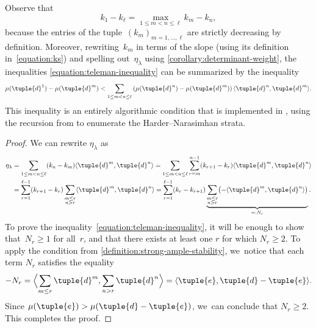 Observe that\vspace*{-5pt}
\begin{equation*}
k_1-k_\ell=\max_{1\leq m<n\leq\ell}k_m-k_n,
\end{equation*}
because the entries of the tuple~$(k_m)_{m=1,\ldots,\ell}$ are strictly decreasing by definition.
Moreover,
rewriting~$k_m$ in terms of the slope
(using its definition in~\eqref{equation:ks})
and spelling out~$\eta_\lambda$ using \cref{corollary:determinant-weight},
the inequalities \eqref{equation:teleman-inequality}
can be summarized by the inequality\vspace*{-1pt}
\begin{equation}
\label{equation:teleman-inequality-for-real}
\mu(\tuple{d}^1)-\mu(\tuple{d}^m)
<
\sum_{1\leq m<n\leq\ell}\left( \mu(\tuple{d}^n)-\mu(\tuple{d}^m) \right)\langle\tuple{d}^n,\tuple{d}^m\rangle.
\end{equation}
This inequality is an entirely algorithmic condition that is implemented in \cite{quivertools},
using the recursion from \cite[Cor.\,3.5]{MR1974891} to enumerate the Harder--Narasimhan strata.

\begin{proof}
We can rewrite $\eta_\lambda$ as\vspace*{-5pt}
\begin{align*}
\eta_\lambda
&= \sum_{1\leq m < n\leq\ell} (k_n - k_m)\langle \tuple{d}^m,\tuple{d}^n \rangle= \sum_{1\leq m < n\leq\ell} \sum_{r = m}^{n-1} (k_{r+1} - k_r) \langle \tuple{d}^m,\tuple{d}^n \rangle \\
&= \sum_{r = 1}^{\ell-1} (k_{r+1} - k_r)\sum_{\substack{m \leq r \\ n > r}} \langle \tuple{d}^m, \tuple{d}^n \rangle= \sum_{r = 1}^{\ell-1} (k_r - k_{r+1})\underbrace{\sum_{\substack{m \leq r \\ n > r}} \bigl( - \langle \tuple{d}^m, \tuple{d}^n \rangle\bigr)}_{=: N_r}.
\end{align*}
To prove the inequality~\eqref{equation:teleman-inequality},
it will be enough to show that~$N_r \geq 1$ for all~$r$,
and that there exists at least one $r$ for which $N_r \geq 2$.
To apply the condition from \cref{definition:strong-ample-stability}, we~notice that each term $N_r$ satisfies the equality
\begin{equation*}
-N_r = \Bigl\langle \sum_{m \leq r} \tuple{d}^m, \sum_{n > r} \tuple{d}^n \Bigr\rangle
= \langle \tuple{e}, \tuple{d} - \tuple{e} \rangle.
\end{equation*}
Since $\mu(\tuple{e}) > \mu(\tuple{d} - \tuple{e})$, we~can conclude that $N_r \geq 2$.
This completes the proof.
\end{proof}

